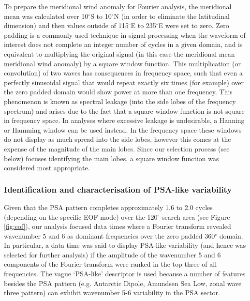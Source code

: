 To prepare the meridional wind anomaly for Fourier analysis, the meridional mean was calculated over 10$^{\circ}$S to 10$^{\circ}$N (in order to eliminate the latitudinal dimension) and then values outside of 115$^{\circ}$E to 235$^{\circ}$E were set to zero. Zero padding is a commonly used technique in signal processing when the waveform of interest does not complete an integer number of cycles in a given domain, and is equivalent to multiplying the original signal (in this case the meridional mean meridional wind anomaly) by a square window function. This multiplication (or convolution) of two waves has consequences in frequency space, such that even a perfectly sinusoidal signal that would repeat exactly six times (for example) over the zero padded domain would show power at more than one frequency. This phenomenon is known as spectral leakage (into the side lobes of the frequency spectrum) and arises due to the fact that a square window function is not square in frequency space. In analyses where excessive leakage is undesirable, a Hanning or Hamming window can be used instead. In the frequency space these windows do not display as much spread into the side lobes, however this comes at the expense of the magnitude of the main lobes. Since our selection process (see below) focuses identifying the main lobes, a square window function was considered most appropriate.

\subsubsection{Identification and characterisation of PSA-like variability}

Given that the PSA pattern completes approximately 1.6 to 2.0 cycles (depending on the specific EOF mode) over the 120$^{\circ}$ search area (see Figure \ref{fig:eof}), our analysis focused data times where a Fourier transform revealed wavenumber 5 and 6 as dominant frequencies over the zero padded 360$^{\circ}$ domain. In particular, a data time was said to display PSA-like variability (and hence was selected for further analysis) if the amplitude of the wavenumber 5 and 6 components of the Fourier transform were ranked in the top three of all frequencies. The vague `PSA-like' descriptor is used because a number of features besides the PSA pattern (e.g. Antarctic Dipole, Amundsen Sea Low, zonal wave three pattern) can exhibit wavenumber 5-6 variability in the PSA sector.


